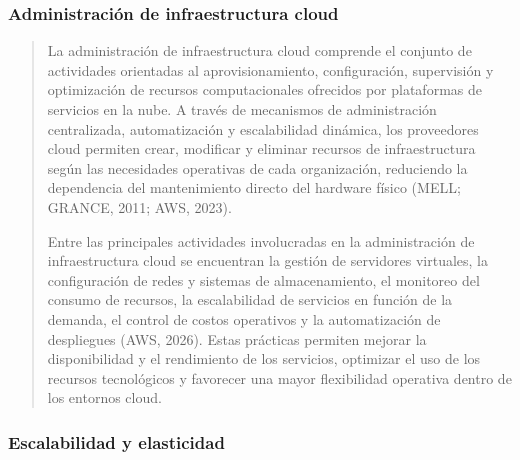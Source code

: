 \documentclass[
]{article}
\begin{document}
\subsubsection{Administración de infraestructura
cloud}\label{administraciuxf3n-de-infraestructura-cloud}

\begin{quote}
La administración de infraestructura cloud comprende el conjunto de
actividades orientadas al aprovisionamiento, configuración, supervisión
y optimización de recursos computacionales ofrecidos por plataformas de
servicios en la nube. A través de mecanismos de administración
centralizada, automatización y escalabilidad dinámica, los proveedores
cloud permiten crear, modificar y eliminar recursos de infraestructura
según las necesidades operativas de cada organización, reduciendo la
dependencia del mantenimiento directo del hardware físico (MELL; GRANCE,
2011; AWS, 2023).

Entre las principales actividades involucradas en la administración de
infraestructura cloud se encuentran la gestión de servidores virtuales,
la configuración de redes y sistemas de almacenamiento, el monitoreo del
consumo de recursos, la escalabilidad de servicios en función de la
demanda, el control de costos operativos y la automatización de
despliegues (AWS, 2026). Estas prácticas permiten mejorar la
disponibilidad y el rendimiento de los servicios, optimizar el uso de
los recursos tecnológicos y favorecer una mayor flexibilidad operativa
dentro de los entornos cloud.
\end{quote}

\subsubsection{\texorpdfstring{ Escalabilidad y
elasticidad}{ Escalabilidad y elasticidad}}\label{escalabilidad-y-elasticidad}
\end{document}
